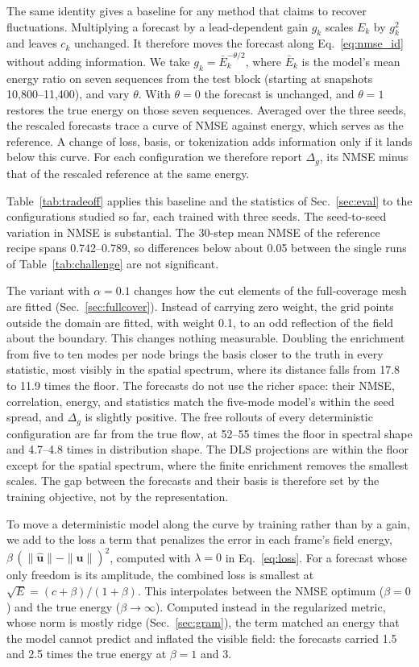 \documentclass[conf]{new-aiaa}
\begin{document}
The same identity gives a baseline for any method that claims to recover fluctuations. Multiplying a forecast by a lead-dependent gain $g_k$ scales $E_k$ by $g_k^2$ and leaves $c_k$ unchanged. It therefore moves the forecast along Eq.~\eqref{eq:nmse_id} without adding information. We take $g_k=\bar E_k^{-\theta/2}$, where $\bar E_k$ is the model's mean energy ratio on seven sequences from the test block (starting at snapshots 10,800--11,400), and vary $\theta$. With $\theta=0$ the forecast is unchanged, and $\theta=1$ restores the true energy on those seven sequences. Averaged over the three seeds, the rescaled forecasts trace a curve of NMSE against energy, which serves as the reference. A change of loss, basis, or tokenization adds information only if it lands below this curve. For each configuration we therefore report $\Delta_g$, its NMSE minus that of the rescaled reference at the same energy.

Table~\ref{tab:tradeoff} applies this baseline and the statistics of Sec.~\ref{sec:eval} to the configurations studied so far, each trained with three seeds. The seed-to-seed variation in NMSE is substantial. The 30-step mean NMSE of the reference recipe spans 0.742--0.789, so differences below about 0.05 between the single runs of Table~\ref{tab:challenge} are not significant.

The variant with $\alpha=0.1$ changes how the cut elements of the full-coverage mesh are fitted (Sec.~\ref{sec:fullcover}). Instead of carrying zero weight, the grid points outside the domain are fitted, with weight 0.1, to an odd reflection of the field about the boundary. This changes nothing measurable. Doubling the enrichment from five to ten modes per node brings the basis closer to the truth in every statistic, most visibly in the spatial spectrum, where its distance falls from 17.8 to 11.9 times the floor. The forecasts do not use the richer space: their NMSE, correlation, energy, and statistics match the five-mode model's within the seed spread, and $\Delta_g$ is slightly positive. The free rollouts of every deterministic configuration are far from the true flow, at 52--55 times the floor in spectral shape and 4.7--4.8 times in distribution shape. The DLS projections are within the floor except for the spatial spectrum, where the finite enrichment removes the smallest scales. The gap between the forecasts and their basis is therefore set by the training objective, not by the representation.

To move a deterministic model along the curve by training rather than by a gain, we add to the loss a term that penalizes the error in each frame's field energy, $\beta\,(\|\hat{\mathbf{u}}\|-\|\mathbf{u}\|)^2$, computed with $\lambda=0$ in Eq.~\eqref{eq:loss}. For a forecast whose only freedom is its amplitude, the combined loss is smallest at $\sqrt{E}=(c+\beta)/(1+\beta)$. This interpolates between the NMSE optimum ($\beta=0$) and the true energy ($\beta\rightarrow\infty$). Computed instead in the regularized metric, whose norm is mostly ridge (Sec.~\ref{sec:gram}), the term matched an energy that the model cannot predict and inflated the visible field: the forecasts carried 1.5 and 2.5 times the true energy at $\beta=1$ and 3.
\end{document}
